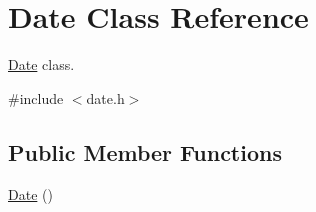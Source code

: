 \hypertarget{class_date}{}\section{Date Class Reference}
\label{class_date}


\hyperlink{class_date}{Date} class.  




{\ttfamily \#include $<$date.\+h$>$}

\subsection*{Public Member Functions}
\begin{DoxyCompactItemize}
\item 
\hypertarget{class_date_a4e59ed4ba66eec61c27460c5d09fa1bd}{}\hyperlink{class_date_a4e59ed4ba66eec61c27460c5d09fa1bd}{Date} ()\label{class_date_a4e59ed4ba66eec61c27460c5d09fa1bd}


\end{DoxyCompactItemize}
